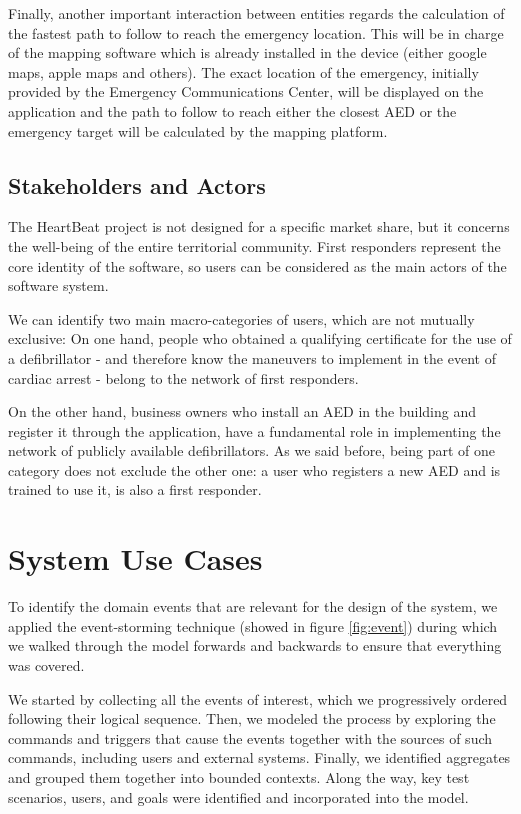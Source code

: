 \documentclass[11pt,a4paper]{article}
\begin{document}
Finally, another important interaction between entities regards the calculation of the fastest path to follow to reach the emergency location. 
%
This will be in charge of the mapping software which is already installed in the device (either google maps, apple maps and others).
%
The exact location of the emergency, initially provided by the Emergency Communications Center, will be displayed on the application and the path to follow to reach either the closest AED or the emergency target will be calculated by the mapping platform.

\subsection{Stakeholders and Actors}
The HeartBeat project is not designed for a specific market share, but it concerns the well-being of the entire territorial community. 
%
First responders represent the core identity of the software, so users can be considered as the main actors of the software system. 

We can identify two main macro-categories of users, which are not mutually exclusive:
On one hand, people who obtained a qualifying certificate for the use of a defibrillator - and therefore know the maneuvers to implement in the event of cardiac arrest - belong to the network of first responders.

On the other hand, business owners who install an AED in the building and register it through the application, have a fundamental role in implementing the network of publicly available defibrillators.
%
As we said before, being part of one category does not exclude the other one: a user who registers a new AED and is trained to use it, is also a first responder.

\section{System Use Cases}
To identify the domain events that are relevant for the design of the system, we applied the event-storming technique (showed in figure \ref{fig:event}) during which we walked through the model forwards and backwards to ensure that everything was covered.

We started by collecting all the events of interest, which we progressively ordered following their logical sequence.
%
Then, we modeled the process by exploring the commands and triggers that cause the events together with the sources of such commands, including users and external systems.
%
Finally, we identified aggregates and grouped them together into bounded contexts.
%
Along the way, key test scenarios, users, and goals were identified and incorporated into the model. 
\end{document}
